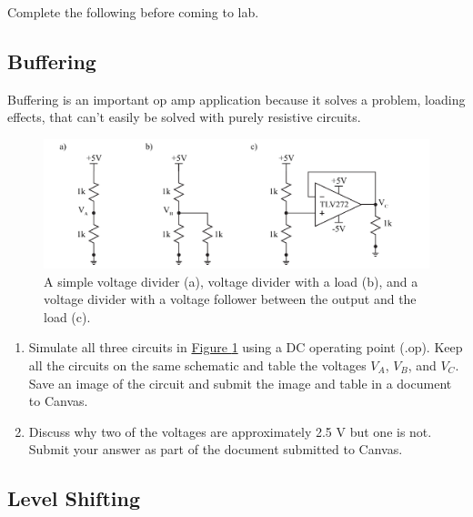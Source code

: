 Complete the following before coming to lab. 

\subsection{Buffering} \label{ssec:6buff}

Buffering is an important op amp application because it solves a problem, loading effects, that can't easily be solved with purely resistive circuits. 

\begin{figure} [h]
	\centering
		\includegraphics[width=1\textwidth]{Lab6buffering.pdf}
	\caption{A simple voltage divider (a), voltage divider with a load (b), and a voltage divider with a voltage follower between the output and the load (c).} \label{fig:6buff}
\end{figure}

\begin{enumerate}
	\item Simulate  all three circuits in \hyperref[fig:6buff]{Figure \ref*{fig:6buff}} using a DC operating point (.op). Keep all the circuits on the same schematic and table the voltages $V_A$, $V_B$, and $V_C$. Save an image of the circuit and submit the image and table in a document to Canvas. \label{itm:6ssec1itm1}
	\item Discuss why two of the voltages are approximately 2.5 V but one is not. Submit your answer as part of the document submitted to Canvas. \label{itm:6ssec1itm2}
\end{enumerate}

\subsection{Level Shifting} \label{ssec:6lvlshift}


